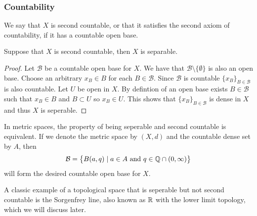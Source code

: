 \documentclass[11pt,a4paper]{article}
\begin{document}
\subsubsection{Countability}

\begin{definition}
  We say that $X$ is second countable, or that it satisfies the second
  axiom of countability, if it has a countable open base.
\end{definition}

\begin{proposition}
  Suppose that $X$ is second countable, then $X$ is separable.
\end{proposition}

\begin{proof}
  Let $\mathcal{B}$ be a countable open base for $X$. We have that 
  $\mathcal{B} \setminus \{\emptyset\}$ is also an open base. Choose
  an arbitrary $x_B \in B$ for each $B \in \mathcal{B}$. Since 
  $\mathcal{B}$ is countable $\{x_B\}_{B \in \mathcal{B}}$ is also 
  countable. Let $U$ be open in $X$. By defintion of an open base exists 
  $B \in \mathcal{B}$ such that $x_B \in B$ and $B \subset U$ so 
  $x_B \in U$. This shows that $\{x_B\}_{B \in \mathcal{B}}$ is dense
  in $X$ and thus $X$ is seperable.
\end{proof}

\begin{remark}
  In metric spaces, the property of being seperable and second countable
  is equivalent. If we denote the metric space by $(X,d)$ and the 
  countable dense set by $A$, then
  \[
    \mathcal{B} = \left\{B(a,q) \mid a \in A \text{ and } q \in \mathbb{Q} \cap 
    (0,\infty)\right\}
  \]
  will form the desired countable open base for $X$.
\end{remark}

\begin{example}
  A classic example of a topological space that is seperable but not
  second countable is the Sorgenfrey line, also known as $\mathbb{R}$ with the lower
  limit topology, which we will discuss later.
\end{example}
\end{document}
